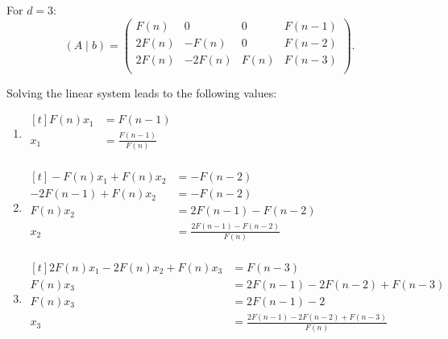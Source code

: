 \documentclass[english,version-2020-11]{uzl-thesis}
\begin{document}
\begin{example}
  For $d = 3$:
  \[
    (A \mid b) = \left(\begin{array}{ccc|r}
      F(n)   & 0       & 0    & F(n - 1) \\
      2 F(n) & -F(n)   & 0    & F(n - 2) \\
      2 F(n) & -2 F(n) & F(n) & F(n - 3) \\
    \end{array}\right).
  \]

  Solving the linear system leads to the following values:
  \begin{enumerate}
    \item $\begin{aligned}[t]
        F(n) x_1 & = F(n - 1)              \\
             x_1 & = \frac{F(n - 1)}{F(n)} \\
      \end{aligned}$
    \item $\begin{aligned}[t]
        -F(n) x_1 + F(n) x_2   & = - F(n - 2)                        \\
        -2 F(n - 1) + F(n) x_2 & = - F(n - 2)                        \\
        F(n) x_2               & = 2 F(n - 1) - F(n - 2)            \\
        x_2                    & = \frac{2 F(n - 1) - F(n - 2)}{F(n)} \\
      \end{aligned}$
    \item $\begin{aligned}[t]
        2 F(n) x_1 - 2 F(n) x_2 + F(n) x_3 & = F(n - 3)                                        \\
                                  F(n) x_3 & = 2 F(n - 1) - 2 F(n - 2) + F(n - 3)              \\
                                  F(n) x_3 & = 2 F(n - 1) - 2                                  \\
                                       x_3 & = \frac{2 F(n - 1) - 2 F(n - 2) + F(n - 3)}{F(n)} \\
      \end{aligned}$
  \end{enumerate}
\end{example}
\end{document}
